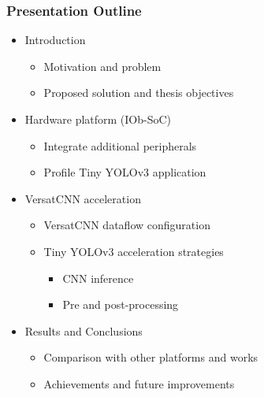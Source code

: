 



\begin{frame}
  \frametitle{Presentation Outline}
  \begin{itemize}
  \item Introduction
    \begin{itemize}
    \item Motivation and problem
    \item Proposed solution and thesis objectives
    \end{itemize}
  \item Hardware platform (IOb-SoC)
    \begin{itemize}
      \item Integrate additional peripherals
      \item Profile Tiny YOLOv3 application
    \end{itemize}
  \item VersatCNN acceleration
    \begin{itemize}
    \item VersatCNN dataflow configuration
    \item Tiny YOLOv3 acceleration strategies
      \begin{itemize}
      \item CNN inference
      \item Pre and post-processing
      \end{itemize}
    \end{itemize}
  \item Results and Conclusions
    \begin{itemize}
      \item Comparison with other platforms and works
      \item Achievements and future improvements
    \end{itemize}
  \end{itemize}
\end{frame}

